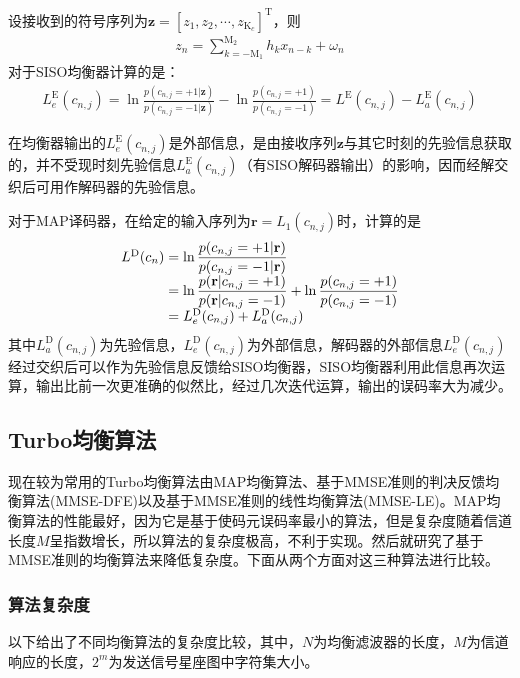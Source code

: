 设接收到的符号序列为$\mathbf{z}=[z_1,z_2,\cdots,z_{\mathrm{K}_c}]^{\mathrm{T}}$，则
\begin{eqnarray}
    z_n=\sum_{k=-\mathrm{M}_1}^{\mathrm{M}_2}h_kx_{n-k}+\omega_n
    \label{equ:2.33}
\end{eqnarray}
对于SISO均衡器计算的是：
\begin{eqnarray}
    L_e^{\mathrm{E}}(c_{n,j})=\ln\frac{p(c_{n,j}=+1|\mathbf{z})}{p(c_{n,j}=-1|\mathbf{z})}-\ln\frac{p(c_{n,j}=+1)}{p(c_{n,j}=-1)}=L^{\mathrm{E}}(c_{n,j})-L_a^{\mathrm{E}}(c_{n,j})
    \label{equ:2.34}
\end{eqnarray}

在均衡器输出的$L_e^{\mathrm{E}}(c_{n,j})$是外部信息，是由接收序列$\mathbf{z}$与其它时刻的先验信息获取的，并不受现时刻先验信息$L_a^{\mathrm{E}}(c_{n,j})$（有SISO解码器输出）的影响，因而经解交织后可用作解码器的先验信息。

对于MAP译码器，在给定的输入序列为$\mathbf{r}={L_1(c_{n,j})}$时，计算的是
\begin{eqnarray}
    \begin{array}{l@{\;=\;}l}
        L^{\mathrm{D}}(c_n)&\ln\dfrac{p(c_{n,j}=+1|\mathbf{r})}{p(c_{n,j}=-1|\mathbf{r})}\\
        &\ln\dfrac{p(\mathbf{r}|c_{n,j}=+1)}{p(\mathbf{r}|c_{n,j}=-1)}+\ln\dfrac{p(c_{n,j}=+1)}{p(c_{n,j}=-1)}\\
        &L_e^{\mathrm{D}}(c_{n,j})+L_a^{\mathrm{D}}(c_{n,j})
    \end{array}
    \label{equ:2.35}
\end{eqnarray}
其中$L_a^{\mathrm{D}}(c_{n,j})$为先验信息，$L_e^{\mathrm{D}}(c_{n,j})$为外部信息，解码器的外部信息$L_e^{\mathrm{D}}(c_{n,j})$经过交织后可以作为先验信息反馈给SISO均衡器，SISO均衡器利用此信息再次运算，输出比前一次更准确的似然比，经过几次迭代运算，输出的误码率大为减少。
\subsection{Turbo均衡算法}
现在较为常用的Turbo均衡算法由MAP均衡算法、基于MMSE准则的判决反馈均衡算法(MMSE-DFE)以及基于MMSE准则的线性均衡算法(MMSE-LE)。MAP均衡算法的性能最好，因为它是基于使码元误码率最小的算法，但是复杂度随着信道长度$M$呈指数增长，所以算法的复杂度极高，不利于实现。然后就研究了基于MMSE准则的均衡算法来降低复杂度。下面从两个方面对这三种算法进行比较。

\subsubsection*{算法复杂度}
以下给出了不同均衡算法的复杂度比较，其中，$N$为均衡滤波器的长度，$M$为信道响应的长度，$2^m$为发送信号星座图中字符集大小。


